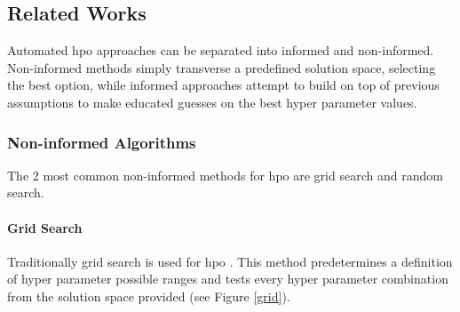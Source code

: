 
\subsection{Related Works}

Automated \acrshort{hpo} approaches can be separated into informed and non-informed. Non-informed methods simply transverse a predefined solution space, selecting the best option, while informed approaches attempt to build on top of previous assumptions to make educated guesses on the best hyper parameter values.

\subsubsection{Non-informed Algorithms}

The 2 most common non-informed methods for \acrshort{hpo} are grid search and random search.

\paragraph{Grid Search}
Traditionally grid search is used for \acrshort{hpo} \parencite{liashchynskyi2019grid}. This method predetermines a definition of hyper parameter possible ranges and tests every hyper parameter combination from the solution space provided (see Figure \ref{grid}).

